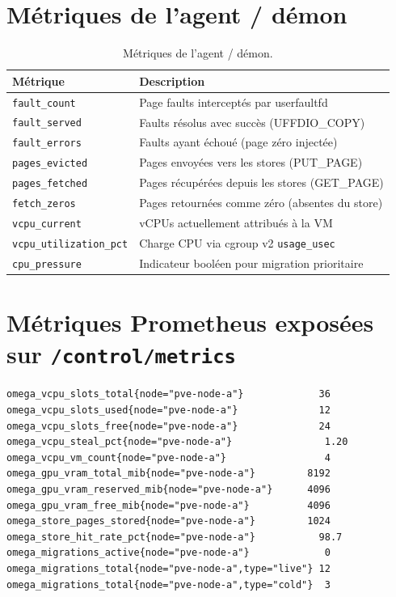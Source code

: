 \section{Métriques de l'agent / démon}

\begin{table}[H]
\centering
\small
\caption{Métriques de l'agent / démon.}
\begin{tabular}{p{4.2cm}p{8.5cm}}
\toprule
\textbf{Métrique} & \textbf{Description} \\
\midrule
\texttt{fault\_count}             & Page faults interceptés par userfaultfd \\
\texttt{fault\_served}            & Faults résolus avec succès (UFFDIO\_COPY) \\
\texttt{fault\_errors}            & Faults ayant échoué (page zéro injectée) \\
\texttt{pages\_evicted}           & Pages envoyées vers les stores (PUT\_PAGE) \\
\texttt{pages\_fetched}           & Pages récupérées depuis les stores (GET\_PAGE) \\
\texttt{fetch\_zeros}             & Pages retournées comme zéro (absentes du store) \\
\texttt{vcpu\_current}            & vCPUs actuellement attribués à la VM \\
\texttt{vcpu\_utilization\_pct}   & Charge CPU via cgroup v2 \texttt{usage\_usec} \\
\texttt{cpu\_pressure}            & Indicateur booléen pour migration prioritaire \\
\bottomrule
\end{tabular}

\end{table}

\section{Métriques Prometheus exposées sur \texttt{/control/metrics}}

\begin{lstlisting}[basicstyle=\ttfamily\scriptsize, frame=single]
omega_vcpu_slots_total{node="pve-node-a"}             36
omega_vcpu_slots_used{node="pve-node-a"}              12
omega_vcpu_slots_free{node="pve-node-a"}              24
omega_vcpu_steal_pct{node="pve-node-a"}                1.20
omega_vcpu_vm_count{node="pve-node-a"}                 4
omega_gpu_vram_total_mib{node="pve-node-a"}         8192
omega_gpu_vram_reserved_mib{node="pve-node-a"}      4096
omega_gpu_vram_free_mib{node="pve-node-a"}          4096
omega_store_pages_stored{node="pve-node-a"}         1024
omega_store_hit_rate_pct{node="pve-node-a"}           98.7
omega_migrations_active{node="pve-node-a"}             0
omega_migrations_total{node="pve-node-a",type="live"} 12
omega_migrations_total{node="pve-node-a",type="cold"}  3
\end{lstlisting}

